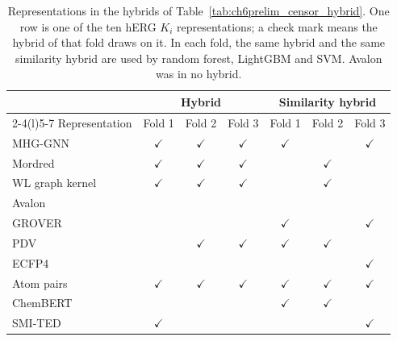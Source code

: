 \begin{table}[htbp]
\centering
\small
\begin{tabular}{@{}lcccccc@{}}
\toprule
 & \multicolumn{3}{c}{Hybrid} & \multicolumn{3}{c}{Similarity hybrid} \\
\cmidrule(lr){2-4}\cmidrule(l){5-7}
Representation & Fold 1 & Fold 2 & Fold 3 & Fold 1 & Fold 2 & Fold 3 \\
\midrule
MHG-GNN & $\checkmark$ & $\checkmark$ & $\checkmark$ & $\checkmark$ & & $\checkmark$ \\
Mordred & $\checkmark$ & $\checkmark$ & $\checkmark$ & & $\checkmark$ & \\
WL graph kernel & $\checkmark$ & $\checkmark$ & $\checkmark$ & & $\checkmark$ & \\
Avalon & & & & & & \\
GROVER & & & & $\checkmark$ & & $\checkmark$ \\
PDV & & $\checkmark$ & $\checkmark$ & $\checkmark$ & $\checkmark$ & \\
ECFP4 & & & & & & $\checkmark$ \\
Atom pairs & $\checkmark$ & $\checkmark$ & $\checkmark$ & $\checkmark$ & $\checkmark$ & $\checkmark$ \\
ChemBERT & & & & $\checkmark$ & $\checkmark$ & \\
SMI-TED & $\checkmark$ & & & & & $\checkmark$ \\
\bottomrule
\end{tabular}
\caption[Representations in the hybrids of the clipped-label experiment]{Representations in the hybrids of Table~\ref{tab:ch6prelim_censor_hybrid}. One row is one of the ten hERG $K_i$ representations; a check mark means the hybrid of that fold draws on it. In each fold, the same hybrid and the same similarity hybrid are used by random forest, LightGBM and SVM. Avalon was in no hybrid.}
\label{tab:ch6prelim_censor_reps}
\end{table}


